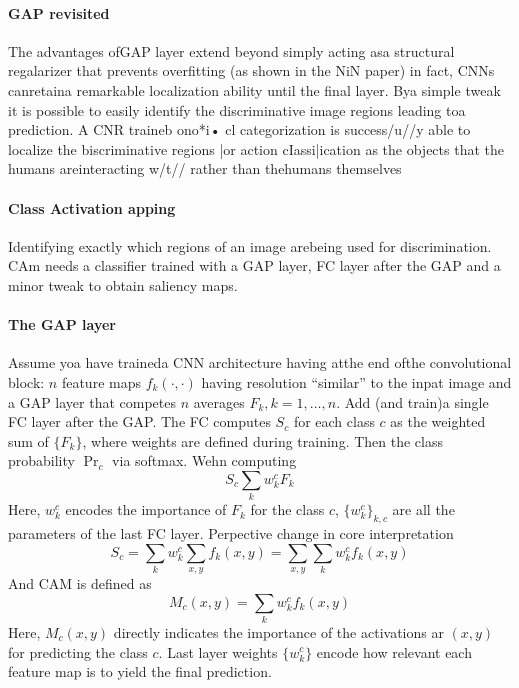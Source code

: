 \paragraph*{GAP revisited}
The advantages ofGAP layer extend beyond simply acting asa structural
regalarizer that prevents overfitting (as shown in the NiN paper)
in fact, CNNs canretaina remarkable localization ability until the final
layer. Bya simple tweak it is possible to easily identify the discriminative
image regions leading toa prediction.
A CNR traineb ono*i•
cl categorization is success/u//y able to localize the
biscriminative regions |or action cIassi|ication as the objects that the
humans areinteracting w/t// rather than thehumans themselves

\paragraph*{Class Activation apping}
Identifying exactly which regions of an image arebeing used for
discrimination.
CAm needs a classifier trained with a GAP layer, FC layer after the GAP and a minor tweak to obtain saliency maps. 

\paragraph*{The GAP layer}
Assume yoa have traineda CNN
architecture having atthe end ofthe
convolutional block: $n$ feature maps $f_k(\cdot,\cdot)$ having
resolution “similar” to the inpat
image and a GAP layer that competes $n$ averages $F_k,k=1,\dots,n$. 
Add (and train)a single FC layer after the GAP.
The FC computes $S_c$ for each class $c$ as the weighted sum of $\{F_k\}$, where weights are defined during training.
Then the class probability $\Pr_c$ via softmax. 
Wehn computing
\[S_c\sum_{k}w_k^cF_k\]
Here, $w^c_k$ encodes the importance of $F_k$ for the class $c$, $\{w_k^c\}_{k,c}$ are all the parameters of the last FC layer. 
Perpective change in core interpretation
\[S_c=\sum_kw_k^c\sum_{x,y}f_k(x,y)=\sum_{x,y}\sum_kw_k^cf_k(x,y)\]
And CAM is defined as
\[M_c(x,y)=\sum_kw_k^cf_k(x,y)\]
Here, $M_c(x,y)$ directly indicates the importance of the activations ar $(x,y)$ for predicting the class $c$. 
Last layer weights $\{w_k^c\}$ encode how relevant each feature map is to yield the final prediction.

